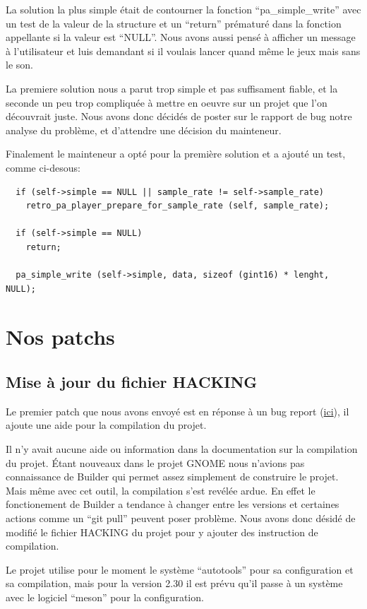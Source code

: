 \documentclass[12pt]{report}
\begin{document}
La solution la plus simple était de contourner la fonction ``pa\_simple\_write''
avec un test de la valeur de la structure et un ``return'' prématuré dans la fonction
appellante si la valeur est ``NULL''. Nous avons aussi pensé à afficher un message à
l'utilisateur et luis demandant si il voulais lancer quand même le jeux mais sans le son.

La premiere solution nous a parut trop simple et pas suffisament fiable, et la
seconde un peu trop compliquée à mettre en oeuvre sur un projet que l'on découvrait juste.
Nous avons donc décidés de poster sur le rapport de bug notre analyse du problème, et
d'attendre une décision du mainteneur.

Finalement le mainteneur a opté pour la première solution et a ajouté un test, comme
ci-desous:
\begin{verbatim}
  if (self->simple == NULL || sample_rate != self->sample_rate)
    retro_pa_player_prepare_for_sample_rate (self, sample_rate);

  if (self->simple == NULL)
    return;

  pa_simple_write (self->simple, data, sizeof (gint16) * lenght, NULL);
\end{verbatim}

\section{Nos patchs}
\subsection{Mise à jour du fichier HACKING}
Le premier patch que nous avons envoyé est en réponse à un bug report
(\href{http://bugzilla.gnome.org/show_bug.cgi?id=788692}{ici}), il ajoute une
aide pour la compilation du projet.

Il n'y avait aucune aide ou information dans la documentation sur la compilation
du projet. Étant nouveaux dans le projet GNOME nous n'avions pas connaissance de 
Builder qui permet assez simplement de construire le projet. Mais même avec cet
outil, la compilation s'est revélée ardue. En effet le fonctionement de Builder a
tendance à changer entre les versions et certaines actions comme un ``git pull''
peuvent poser problème. Nous avons donc désidé de modifié le fichier HACKING du
projet pour y ajouter des instruction de compilation.

Le projet utilise pour le moment le système ``autotools'' pour sa configuration et 
sa compilation, mais pour la version 2.30 il est prévu qu'il passe à un système
avec le logiciel ``meson'' pour la configuration.
\end{document}
